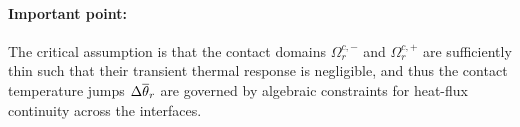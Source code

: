 \paragraph*{Important point:} The critical assumption is that the contact domains $\Omega^{c,-}_r$ and $\Omega^{c,+}_r$ are sufficiently thin such that their transient thermal response is negligible, and thus the contact temperature jumps $\Delta\overline{\theta}_r$ are governed by algebraic constraints for heat-flux continuity across the interfaces.